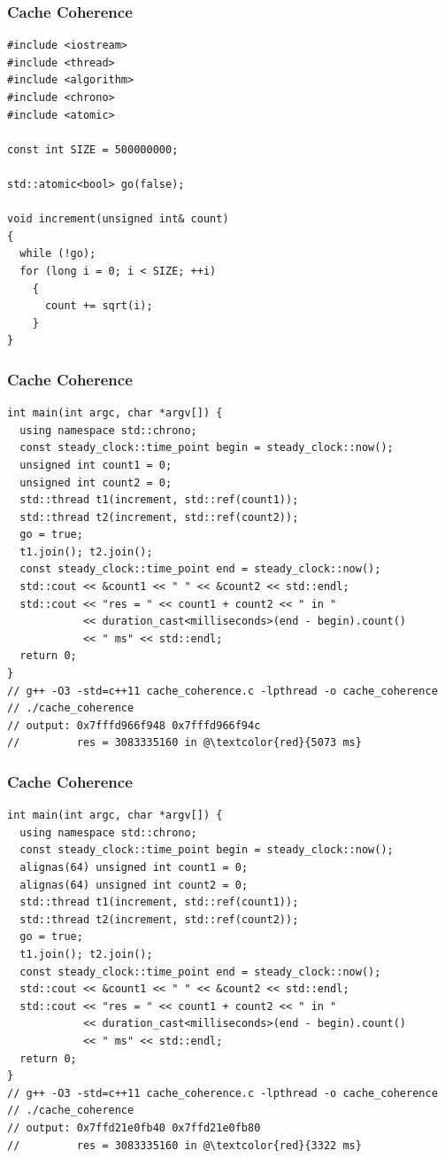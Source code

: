 \documentclass{beamer}
\begin{document}
\begin{frame}[fragile]
\frametitle{Cache Coherence}
\scriptsize

\begin{lstlisting}[linebackgroundcolor={\lstcolorlines{11,16}}]
#include <iostream>
#include <thread>
#include <algorithm>
#include <chrono>
#include <atomic>

const int SIZE = 500000000;

std::atomic<bool> go(false);

void increment(unsigned int& count)
{
  while (!go);
  for (long i = 0; i < SIZE; ++i)
    {
      count += sqrt(i);
    }
}
\end{lstlisting}

\end{frame}

\begin{frame}[fragile]
\frametitle{Cache Coherence}
\scriptsize

\begin{lstlisting}[linebackgroundcolor={\lstcolorlines{4,5,6,7}}]
int main(int argc, char *argv[]) {
  using namespace std::chrono;
  const steady_clock::time_point begin = steady_clock::now();
  unsigned int count1 = 0;
  unsigned int count2 = 0;
  std::thread t1(increment, std::ref(count1));
  std::thread t2(increment, std::ref(count2));
  go = true;
  t1.join(); t2.join();
  const steady_clock::time_point end = steady_clock::now();
  std::cout << &count1 << " " << &count2 << std::endl;
  std::cout << "res = " << count1 + count2 << " in "
            << duration_cast<milliseconds>(end - begin).count()
            << " ms" << std::endl;
  return 0;
}
// g++ -O3 -std=c++11 cache_coherence.c -lpthread -o cache_coherence
// ./cache_coherence
// output: 0x7fffd966f948 0x7fffd966f94c
//         res = 3083335160 in @\textcolor{red}{5073 ms}
\end{lstlisting}

\end{frame}

\begin{frame}[fragile]
\frametitle{Cache Coherence}
\scriptsize

\begin{lstlisting}[linebackgroundcolor={\lstcolorlines{4,5,6,7}}]
int main(int argc, char *argv[]) {
  using namespace std::chrono;
  const steady_clock::time_point begin = steady_clock::now();
  alignas(64) unsigned int count1 = 0;
  alignas(64) unsigned int count2 = 0;
  std::thread t1(increment, std::ref(count1));
  std::thread t2(increment, std::ref(count2));
  go = true;
  t1.join(); t2.join();
  const steady_clock::time_point end = steady_clock::now();
  std::cout << &count1 << " " << &count2 << std::endl;
  std::cout << "res = " << count1 + count2 << " in "
            << duration_cast<milliseconds>(end - begin).count()
            << " ms" << std::endl;
  return 0;
}
// g++ -O3 -std=c++11 cache_coherence.c -lpthread -o cache_coherence
// ./cache_coherence
// output: 0x7ffd21e0fb40 0x7ffd21e0fb80
//         res = 3083335160 in @\textcolor{red}{3322 ms}
\end{lstlisting}

\end{frame}
\end{document}
